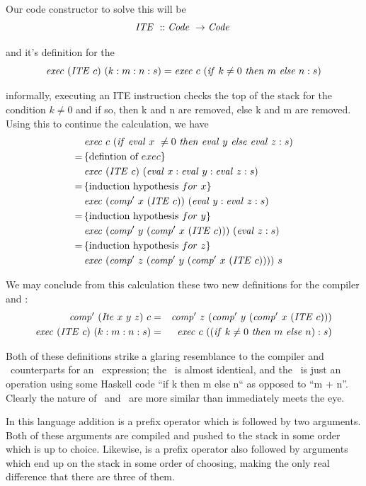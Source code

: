 \documentclass {article}
\begin{document}
\newcommand{\ITEt}{\textit{ITE}}
\newcommand{\ITE}{\mathit{ITE\ }}
Our code constructor to solve this will be
	\[ \ITE :: \Code \rightarrow \Code \]

and it's definition for the \vm
	\[ \Exec (\ITE c)\ (k:m:n:s) 
		= \Exec c\ (\ifff k \not= 0\ \tthen m\ \eelse n:s) \]

informally, executing an ITE instruction
checks the top of the stack for the condition $k \not= 0$
and if so, then k and n are removed,
else k and m are removed.
Using this to continue the calculation, we have
\begin{align*}
	&\Exec c\ (\ifff \evalf  x\ \not= 0\ \tthen \evalf  y\ \eelse \evalf  z :s) \\
	=\, & \{\mbox{defintion of}\ exec\} \\
	&\Exec (\ITE c)\ (\evalf  x:\evalf  y:\evalf  z:s) \\
	=\, & \{\mbox{induction hypothesis}\ for\ x\} \\
	&\Exec (\Compp  x\ (\ITE c))\ (\evalf  y:\evalf  z:s) \\
	=\, & \{\mbox{induction hypothesis}\ for\ y\} \\
	&\Exec (\Compp  y\ (\Compp  x\ (\ITE c)))\ (\evalf  z:s) \\
	=\, & \{\mbox{induction hypothesis}\ for\ z\} \\
	&\Exec (\Compp  z\ (\Compp  y\ (\Compp  x\ (\ITE c))))\ s
\end{align*}

We may conclude from this calculation these two new definitions
for the compiler and \vm: 
\begin{eqnarray}
	\Compp  (\Ite x\ y\ z)\ c &=&  \Compp  z\ (\Compp  y\ (\Compp  x\ (\ITE c))) \label{compite}\\
	\Exec (\ITE c)\ (k:m:n:s) &=& \Exec c\ ((\ifff k \not= 0\ \tthen m\ \eelse n):s) \label{execite}
\end{eqnarray}

Both of these definitions strike a glaring resemblance to
the compiler and \vm\ counterparts for an \add\ expression;
the \compp\ is almost identical, and the \exec\ is just an
operation using some Haskell code ``if k then m else n`` as 
opposed to ``m + n''.
Clearly the nature of \add\ and \ite\
are more similar than immediately meets the eye.

In this language
addition is a prefix operator which is followed by two arguments.
Both of these arguments are compiled and pushed to the stack
in some order which is up to choice. Likewise, \ite is a prefix operator also followed by arguments 
which end up on the stack in some order of choosing, 
making the only real difference that there are three of them.
\end{document}
